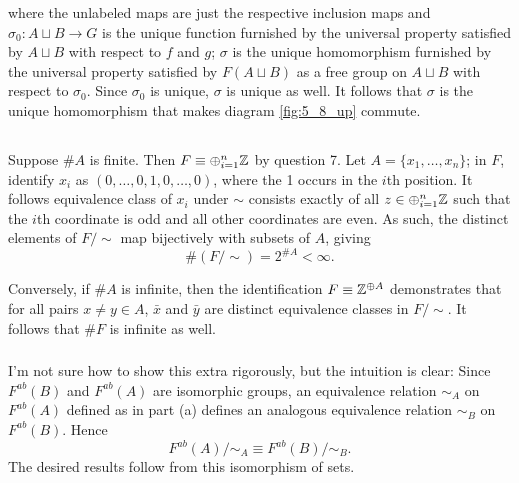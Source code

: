 \documentclass[12pt]{article}
\begin{document}
\begin{center}
\end{center}
where the unlabeled maps are just the respective inclusion maps and $\sigma_0:A \sqcup B \rightarrow G$ is the unique function furnished by the universal property satisfied by $A \sqcup B$ with respect to $f$ and $g$; 
$\sigma$ is the unique homomorphism furnished by the universal property satisfied by $F(A \sqcup B)$ as a free group on $A \sqcup B$ with respect to $\sigma_0$. 
Since $\sigma_0$ is unique, $\sigma$ is unique as well. 
It follows that $\sigma$ is the unique homomorphism that makes diagram \ref{fig:5_8_up} commute. 

\setcounter{subsection}{9}
\subsection{}
\subsubsection{}
Suppose $\#A$ is finite. 
Then $F \equiv \oplus_{i = 1}^{n} \Z$ by question 7.  
Let $A = \{x_1, \ldots, x_n\}$; 
in $F$, identify $x_i$ as $(0, \ldots, 0, 1, 0, \ldots, 0)$, where the 1 occurs in the $i$th position. 
It follows equivalence class of $x_i$ under $\sim$ consists exactly of all $z \in \oplus_{i = 1}^{n}\mathbb{Z}$ such that the $i$th coordinate is odd and all other coordinates are even. 
As such, the distinct elements of $F / \sim$ map bijectively with subsets of $A$, giving 
$$\#(F/\sim) = 2^{\#A} < \infty.$$

Conversely, if $\#A$ is infinite, then the identification $F \equiv \Z^{\oplus A}$ demonstrates that for all pairs $x \neq y \in A$, $\bar{x}$ and $\bar{y}$ are distinct equivalence classes in $F / \sim$.
It follows that $\#F$ is infinite as well. 

\subsubsection{}
I'm not sure how to show this extra rigorously, but the intuition is clear: 
Since $F^{ab}(B)$ and $F^{ab}(A)$ are isomorphic groups, an equivalence relation $\sim_{A}$ on $F^{ab}(A)$ defined as in part (a) defines an analogous equivalence relation $\sim_{B}$ on $F^{ab}(B)$. 
Hence 
$$F^{ab}(A) / \sim_A \equiv F^{ab}(B) / \sim_B.$$
The desired results follow from this isomorphism of sets. 
\end{document}
